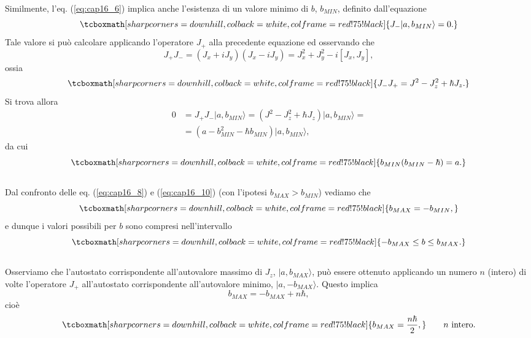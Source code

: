 Similmente, l'eq. (\ref{eq:cap16_6}) implica anche l'esistenza di un valore minimo di $b$,  $b_{MIN}$, definito dall'equazione
	\begin{equation}
		\tcboxmath[sharp corners=downhill, colback=white, colframe=red!75!black]{
			J_{-} \vert a, b_{MIN} \rangle =0.
			}
	\end{equation}
Tale valore si può calcolare applicando l'operatore $J_+$ alla precedente equazione ed osservando che
	\begin{equation}
		J_+J_- = (J_x+iJ_y)(J_x-iJ_y)= J_x^2 +J_y ^2-i[J_x, J_y] ,
	\end{equation}
ossia
	\begin{equation}
		\tcboxmath[sharp corners=downhill, colback=white, colframe=red!75!black]{
			J_-J_+ = J^2 -J_z ^2 +\hbar J_z .
			}
	\label{eq:cap16_9}
	\end{equation}
Si trova allora
	\begin{align}
		0&=J_{+}J_{-} \vert a, b_{MIN} \rangle = (J^2 -J_z ^2 +\hbar J_z)\vert a, b_{MIN} \rangle = \nonumber \\
		&=(a- b_{MIN} ^2 - \hbar b_{MIN} )\vert a, b_{MIN} \rangle ,
	\end{align}
da cui
	\begin{equation}
		\tcboxmath[sharp corners=downhill, colback=white, colframe=red!75!black]{
			b_{MIN}(b_{MIN}-\hbar) =a .
			}
	\label{eq:cap16_10}
	\end{equation}\\
	
Dal confronto delle eq. (\ref{eq:cap16_8}) e (\ref{eq:cap16_10}) (con l'ipotesi $b_{MAX} > b_{MIN}$) vediamo che
	\begin{equation}
		\tcboxmath[sharp corners=downhill, colback=white, colframe=red!75!black]{
			b_{MAX} = - b_{MIN} ,
			}
	\end{equation}
e dunque i valori possibili per $b$ sono compresi nell'intervallo
	\begin{equation}
		\tcboxmath[sharp corners=downhill, colback=white, colframe=red!75!black]{
			-b_{MAX} \leq b \leq b_{MAX} .
			}
	\end{equation}\\
	
Osserviamo che l'autostato corrispondente all'autovalore massimo di $J_z$, $\vert a, b_{MAX}\rangle$, può essere ottenuto applicando un numero $n$ (intero) di volte l'operatore $J_+$ all'autostato corrispondente all'autovalore minimo, $\vert a, - b_{MAX}\rangle $. Questo implica
	\begin{equation}
		b_{MAX}=-b_{MAX}+n\hbar, 
	\end{equation}
cioè
	\begin{equation}
		\tcboxmath[sharp corners=downhill, colback=white, colframe=red!75!black]{
			b_{MAX}=\frac{n\hbar}{2},
			} \qquad n\textrm{ intero.}
	\end{equation}\\
	
